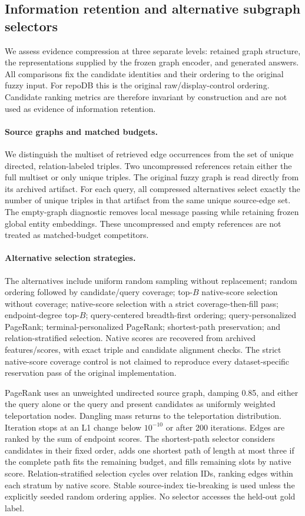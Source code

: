 \subsection{Information retention and alternative subgraph selectors}

We assess evidence compression at three separate levels: retained graph
structure, the representations supplied by the frozen graph encoder, and
generated answers. All comparisons fix the candidate identities and their
ordering to the original fuzzy input. For repoDB this is the original
raw/display-control ordering. Candidate ranking metrics are therefore invariant
by construction and are not used as evidence of information retention.

\paragraph{Source graphs and matched budgets.}
We distinguish the multiset of retrieved edge occurrences from the set of unique
directed, relation-labeled triples. Two uncompressed references retain either
the full multiset or only unique triples. The original fuzzy graph is read
directly from its archived artifact. For each query, all compressed alternatives
select exactly the number of unique triples in that artifact from the same
unique source-edge set. The empty-graph diagnostic removes local message
passing while retaining frozen global entity embeddings. These uncompressed
and empty references are not treated as matched-budget competitors.

\paragraph{Alternative selection strategies.}
The alternatives include uniform random sampling without replacement;
random ordering followed by candidate/query coverage; top-$B$ native-score
selection without coverage; native-score selection with a strict coverage-then-fill
pass; endpoint-degree top-$B$; query-centered breadth-first ordering;
query-personalized PageRank; terminal-personalized PageRank; shortest-path
preservation; and relation-stratified selection. Native scores are recovered
from archived features/scores, with exact triple and candidate alignment checks.
The strict native-score coverage control is not claimed to reproduce every
dataset-specific reservation pass of the original implementation.

PageRank uses an unweighted undirected source graph, damping 0.85, and either
the query alone or the query and present candidates as uniformly weighted
teleportation nodes. Dangling mass returns to the teleportation distribution.
Iteration stops at an L1 change below $10^{-10}$ or after 200 iterations.
Edges are ranked by the sum of endpoint scores. The shortest-path selector
considers candidates in their fixed order, adds one shortest path of length at
most three if the complete path fits the remaining budget, and fills remaining
slots by native score. Relation-stratified selection cycles over relation IDs,
ranking edges within each stratum by native score. Stable source-index
tie-breaking is used unless the explicitly seeded random ordering applies.
No selector accesses the held-out gold label.


